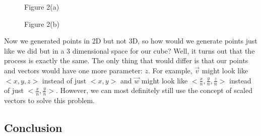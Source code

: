 \documentclass[14pt]{article}
\begin{document}
\begin{figure}[H]
\begin{center}
\begin{minipage}[b]{0.48\textwidth}
\begin{center}
			\end{center}
		\end{minipage}
	\end{center}
	\begin{center}
		\begin{minipage}[t]{0.48\textwidth}
			\caption*{Figure 2(a)}
		\end{minipage}
		\hfill
		\begin{minipage}[t]{0.48\textwidth}
			\caption*{Figure 2(b)}
		\end{minipage}
	\end{center}
\end{figure}

\vspace{-7mm}

Now we generated points in 2D but not 3D, so how would we generate points just like we did but in a 3 dimensional space for our cube? Well, it turns out that the process is exactly the same. The only thing that would differ is that our points and vectors would have one more parameter: $z$. For example, $\overrightarrow{v}$ might look like $<x, y, z>$ instead of just $<x, y>$ and $\overrightarrow{w}$ might look like $<\frac{x}{n}, \frac{y}{n}, \frac{z}{n}>$ instead of just $<\frac{x}{n}, \frac{y}{n}>$. However, we can most definitely still use the concept of scaled vectors to solve this problem.

\vspace{-1mm}

\subsection*{Conclusion}
\end{document}
